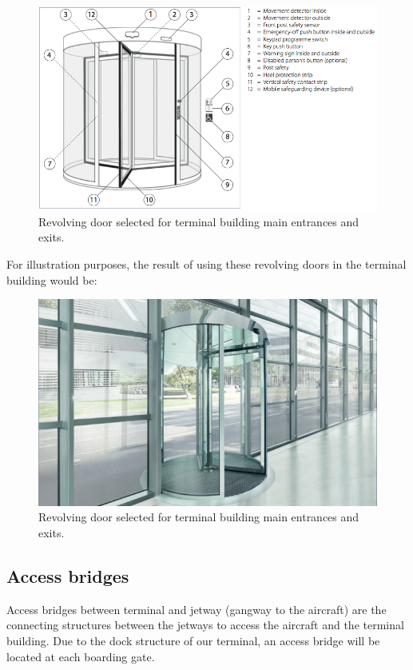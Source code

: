 		\begin{figure}[H]
	\centering
\includegraphics[width=13cm]{./images/Facade/scheme}
\caption{Revolving door selected for terminal building main entrances and exits.}
\end{figure}

For illustration purposes, the result of using these revolving doors in the terminal building would be:

		\begin{figure}[H]
	\centering
\includegraphics[width=13cm]{./images/Facade/revolving}
\caption{Revolving door selected for terminal building main entrances and exits.}
\end{figure}
	
	
		\subsection{Access bridges}
	Access bridges between terminal and jetway (gangway to the aircraft) are the connecting structures between the jetways to access the aircraft and the terminal building. Due to the dock structure of our terminal, an access bridge will be located at each boarding gate.
	
